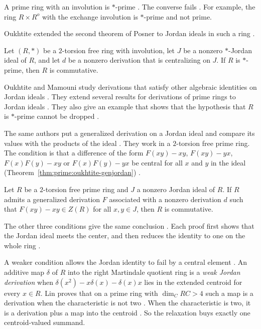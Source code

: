 A prime ring with an involution is $*$-prime \cite[p.~415]{Oukhtite2011}. The
converse fails \cite[p.~415]{Oukhtite2011}. For example, the ring
$R\times R^{o}$ with the exchange involution is $*$-prime and not prime.

Oukhtite extended the second theorem of Posner to Jordan ideals in such a ring
\cite[p.~415]{Oukhtite2011}.

\begin{theorem}\label{thm:prime:oukhtite-jordan}
Let $(R,*)$ be a $2$-torsion free ring with involution, let $J$ be a nonzero
$*$-Jordan ideal of $R$, and let $d$ be a nonzero derivation that is centralizing
on $J$. If $R$ is $*$-prime, then $R$ is commutative.
\end{theorem}

Oukhtite and Mamouni study derivations that satisfy other algebraic identities
on Jordan ideals \cite[p.~341]{OukhtiteMamouni2012}. They extend several
results for derivations of prime rings to Jordan ideals
\cite[p.~341]{OukhtiteMamouni2012}. They also give an example that shows that
the hypothesis that $R$ is $*$-prime cannot be dropped
\cite[p.~341]{OukhtiteMamouni2012}.

The same authors put a generalized derivation on a Jordan ideal and compare
its values with the products of the ideal \cite[p.~1]{OukhtiteMamouni2015}.
They work in a $2$-torsion free prime ring. The condition is that a difference
of the form $F(xy)-xy$, $F(xy)-yx$, $F(x)F(y)-xy$ or $F(x)F(y)-yx$ be central
for all $x$ and $y$ in the ideal (Theorem~\ref{thm:prime:oukhtite-genjordan})
\cite[p.~1]{OukhtiteMamouni2015}.

\begin{theorem}\label{thm:prime:oukhtite-genjordan}
Let $R$ be a $2$-torsion free prime ring and $J$ a nonzero Jordan ideal of $R$. If
$R$ admits a generalized derivation $F$ associated with a nonzero derivation $d$
such that $F(xy)-xy\in Z(R)$ for all $x,y\in J$, then $R$ is commutative.
\end{theorem}

The other three conditions give the same conclusion \cite[Theorems~2 and~3,
pp.~3--5]{OukhtiteMamouni2015}. Each proof first shows that the Jordan ideal
meets the center, and then reduces the identity to one on the whole ring
\cite[pp.~3--4]{OukhtiteMamouni2015}.

A weaker condition allows the Jordan identity to fail by a central element
\cite[p.~1]{Lin2020WeakJordan}. An additive map $\delta$ of $R$ into the right
Martindale quotient ring is a \emph{weak Jordan derivation}
\cite[p.~1]{Lin2020WeakJordan} when $\delta(x^{2})-x\delta(x)-\delta(x)x$ lies
in the extended centroid for every $x\in R$. Lin proves that on a prime ring
with $\dim_{C}RC>4$ such a map is a derivation when the characteristic is not
two \cite[Theorem~1.2]{Lin2020WeakJordan}. When the characteristic is two, it
is a derivation plus a map into the centroid
\cite[Theorem~1.2]{Lin2020WeakJordan}. So the relaxation buys exactly one
centroid-valued summand.

